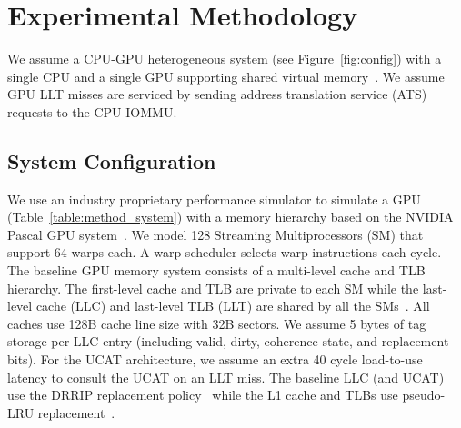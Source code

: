 


\section{Experimental Methodology}
\label{sec:method}

\noindent We assume a CPU-GPU heterogeneous system (see
Figure~\ref{fig:config}) with a single CPU and a single GPU supporting
shared virtual memory~\cite{intelgen9, amdzen, gpu_pascal}. We assume
GPU LLT misses are serviced by sending address translation service
(ATS) ~\cite{vesley2016ispass,ats_spec} requests to the CPU IOMMU.

\subsection{System Configuration}

\noindent We use an industry proprietary performance simulator to
simulate a GPU (Table~\ref{table:method_system}) with a memory
hierarchy based on the NVIDIA Pascal GPU system~\cite{gpu_pascal}.
 We
model 128 Streaming Multiprocessors (SM) that support 64 warps each. A
warp scheduler selects warp instructions each cycle. The baseline GPU
memory system consists of a multi-level cache and TLB hierarchy. The
first-level cache and TLB are private to each SM while the last-level
cache (LLC) and last-level TLB (LLT) are shared by all the
SMs~\cite{SharedLLT}. All caches use 128B cache line size with 32B
sectors. We assume 5 bytes of tag storage per LLC entry (including
valid, dirty, coherence state, and replacement bits). For the UCAT
architecture, we assume an extra 40 cycle load-to-use latency to
consult the UCAT on an LLT miss. The baseline LLC (and UCAT) use the
DRRIP replacement policy~\cite{jaleel_rrip} while the L1 cache and
TLBs use pseudo-LRU replacement~\cite{jaleel_rrip}.

